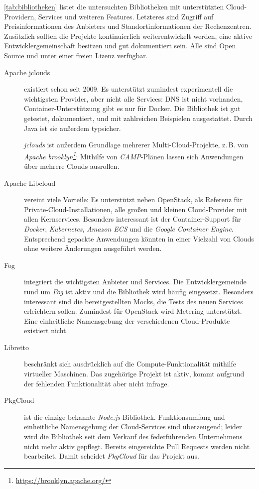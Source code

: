 \autoref*{tab:bibliotheken} listet die untersuchten Bibliotheken mit unterstützten Cloud-Providern, Services und weiteren Features. Letzteres sind Zugriff auf Preisinformationen des Anbieters und Standortinformationen der Rechenzentren. Zusätzlich sollten die Projekte kontinuierlich weiterentwickelt werden, eine aktive Entwicklergemeinschaft besitzen und gut dokumentiert sein. Alle sind Open Source und unter einer freien Lizenz verfügbar.

\begin{description}
	
	\item[Apache jclouds] existiert schon seit 2009. Es unterstützt zumindest experimentell die wichtigsten Provider, aber nicht alle Services: DNS ist nicht vorhanden, Container-Unterstützung gibt es nur für Docker. Die Bibliothek ist gut getestet, dokumentiert, und mit zahlreichen Beispielen ausgestattet. Durch Java ist sie außerdem typsicher. 
	
	\emph{jclouds} ist außerdem Grundlage mehrerer Multi-Cloud-Projekte, z.\,B. von \emph{Apache brooklyn\footnote{\url{https://brooklyn.apache.org/}}}: Mithilfe von \emph{CAMP}-Plänen lassen sich Anwendungen über mehrere Clouds ausrollen.

	\item[Apache Libcloud] vereint viele Vorteile: Es unterstützt neben OpenStack, als Referenz für Private-Cloud-Installationen, alle großen und kleinen Cloud-Provider mit allen Kernservices. Besonders interessant ist der Container-Support für \emph{Docker}, \emph{Kubernetes}, \emph{Amazon ECS} und die \emph{Google Container Engine}. Entsprechend gepackte Anwendungen könnten in einer Vielzahl von Clouds ohne weitere Änderungen ausgeführt werden.

	\item[Fog] integriert die wichtigsten Anbieter und Services. Die Entwicklergemeinde rund um \emph{Fog} ist aktiv und die Bibliothek wird häufig eingesetzt. Besonders interessant sind die bereitgestellten Mocks, die Tests des neuen Services erleichtern sollen. Zumindest für OpenStack wird Metering unterstützt. Eine einheitliche Namensgebung der verschiedenen Cloud-Produkte existiert nicht.

	\item[Libretto] beschränkt sich ausdrücklich auf die Compute-Funktionalität mithilfe virtueller Maschinen. Das zugehörige Projekt ist aktiv, kommt aufgrund der fehlenden Funktionalität aber nicht infrage.

	\item[PkgCloud] ist die einzige bekannte \emph{Node.js}-Bibliothek. Funktionsumfang und einheitliche Namensgebung der Cloud-Services sind überzeugend; leider wird die Bibliothek seit dem Verkauf des federführenden Unternehmens nicht mehr aktiv gepflegt. Bereits eingereichte Pull Requests werden nicht bearbeitet. Damit scheidet \emph{PkgCloud} für das Projekt aus.

\end{description}

